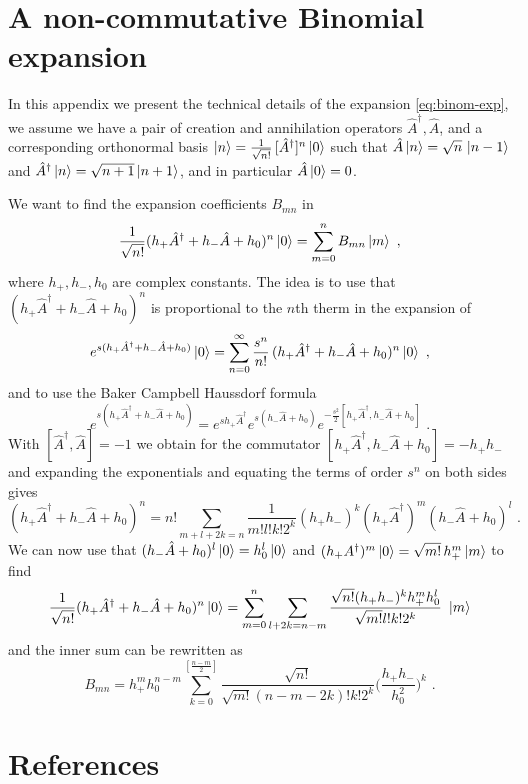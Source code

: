 \documentclass[12pt]{iopart} %
\begin{document}
 \section{A non-commutative Binomial expansion}\label{app:B}
 
 In this appendix we present the technical details of the expansion \eqref{eq:binom-exp}, we assume we have a pair of creation and annihilation operators $\hat A^{\dagger}, \hat A$, and a corresponding orthonormal basis $\ket{n}=\frac{1}{\sqrt{n!}}\, [\hat A^{\dagger}]^n\ket{0}$ such that $\hat A \ket{n}=\sqrt{n}\, \ket{n-1}$ and $\hat A^{\dagger}\ket{n}=\sqrt{n+1}\ket{n+1}$, and in particular $\hat A \ket{0}=0$. 
 
 We want to find the expansion coefficients $B_{mn}$ in 
 \begin{equation}
 \frac{1}{\sqrt{n!}}(h_{+}\hat A^{\dagger}+h_{-}\hat A+h_0)^n\ket{0}=\sum_{m=0}^n B_{mn} \ket{m}\, \, ,
 \end{equation}
where $h_{+},h_{-},h_0$ are complex constants. The idea is to use that $(h_{+}\hat A^{\dagger}+h_{-}\hat A+h_0)^n$ is proportional to the $n$th therm in the expansion of 
\begin{equation}
e^{s(h_{+}\hat A^{\dagger}+h_{-}\hat A+h_0)}\ket{0}=\sum_{n=0}^{\infty}\frac{s^n}{n!}\, (h_{+}\hat A^{\dagger}+h_{-}\hat A+h_0)^n\ket{0}\,\, ,
\end{equation}
and to use the Baker Campbell Haussdorf formula 
\begin{equation}
e^{s(h_{+}\hat A^{\dagger}+h_{-}\hat A+h_0)}=e^{sh_{+}\hat A^{\dagger}}e^{s(h_{-}\hat A+h_0)}  e^{-\frac{s^2}{2} [h_{+}\hat A^{\dagger}, h_{-}\hat A+h_0]}\,\, .    
\end{equation}
With $[\hat A^{\dagger}, \hat A]=-1$ we obtain for the commutator $[h_{+}\hat A^{\dagger}, h_{-}\hat A+h_0]=-h_{+}h_{-}$ and expanding the exponentials and equating the terms of order $s^n$ on both sides gives 
\begin{equation}
(h_{+}\hat A^{\dagger}+h_{-}\hat A+h_0)^n=n! \sum_{m+l+2k=n}\frac{1}{m!l!k!2^k} (h_{+}h_{-})^k (h_{+}\hat A^{\dagger})^m(h_{-}\hat A+h_0)^l\,\, .
\end{equation}
We can now use that $(h_{-}\hat A+h_0)^l\ket{0}=h_0^l\ket{0}$ and $(h_{+}A^{\dagger})^m\ket{0}=\sqrt{m!}\, h_{+}^m\ket{m}$ to find 
\begin{equation}
 \frac{1}{\sqrt{n!}}(h_{+}\hat A^{\dagger}+h_{-}\hat A+h_0)^n\ket{0}=
 \sum_{m=0}^n\sum_{l+2k=n-m}\frac{\sqrt{n!}(h_{+}h_{-})^kh_{+}^mh_0^l}{\sqrt{m!}l! k! 2^k}\,\, \ket{m}
\end{equation}
and the inner sum can be rewritten as
\begin{equation}
B_{mn}= h_{+}^m h_0^{n-m}\sum_{k=0}^{[\frac{n-m}{2}]}\frac{\sqrt{n!}}{\sqrt{m!}(n-m-2k)! k! 2^k} \bigg(\frac{h_{+}h_{-}}{h_0^2}\bigg)^k \,\, . 
\end{equation}

\section*{References}

{}
\end{document}
